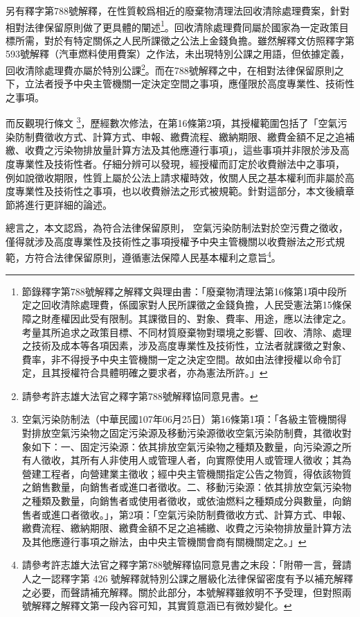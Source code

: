 \documentclass[12pt,a4paper]{article}
\begin{document}

另有釋字第788號解釋，在性質較爲相近的廢棄物清理法回收清除處理費案，針對相對法律保留原則做了更具體的闡述\footnote{節錄釋字第788號解釋之解釋文與理由書：「廢棄物清理法第16條第1項中段所定之回收清除處理費，係國家對人民所課徵之金錢負擔，人民受憲法第15條保障之財產權因此受有限制。其課徵目的、對象、費率、用途，應以法律定之。考量其所追求之政策目標、不同材質廢棄物對環境之影響、回收、清除、處理之技術及成本等各項因素，涉及高度專業性及技術性，立法者就課徵之對象、費率，非不得授予中央主管機關一定之決定空間。故如由法律授權以命令訂定，且其授權符合具體明確之要求者，亦為憲法所許。」}。回收清除處理費同屬於國家為一定政策目標所需，對於有特定關係之人民所課徵之公法上金錢負擔。雖然解釋文仿照釋字第593號解釋（汽車燃料使用費案）之作法，未出現特別公課之用語，但依據定義，回收清除處理費亦屬於特別公課\footnote{請參考許志雄大法官之釋字第788號解釋協同意見書。}。而在788號解釋之中，在相對法律保留原則之下，立法者授予中央主管機關一定決定空間之事項，應僅限於高度專業性、技術性之事項。

而反觀現行條文
\footnote{空氣污染防制法（中華民國107年06月25日）第16條第1項：「各級主管機關得對排放空氣污染物之固定污染源及移動污染源徵收空氣污染防制費，其徵收對象如下：一、固定污染源：依其排放空氣污染物之種類及數量，向污染源之所有人徵收，其所有人非使用人或管理人者，向實際使用人或管理人徵收；其為營建工程者，向營建業主徵收；經中央主管機關指定公告之物質，得依該物質之銷售數量，向銷售者或進口者徵收。二、移動污染源：依其排放空氣污染物之種類及數量，向銷售者或使用者徵收，或依油燃料之種類成分與數量，向銷售者或進口者徵收。」，第2項：「空氣污染防制費徵收方式、計算方式、申報、繳費流程、繳納期限、繳費金額不足之追補繳、收費之污染物排放量計算方法及其他應遵行事項之辦法，由中央主管機關會商有關機關定之。」}，歷經數次修法，在第16條第2項，其授權範圍包括了「空氣污染防制費徵收方式、計算方式、申報、繳費流程、繳納期限、繳費金額不足之追補繳、收費之污染物排放量計算方法及其他應遵行事項」，這些事項并非限於涉及高度專業性及技術性者。仔細分辨可以發現，經授權而訂定於收費辦法中之事項，
例如說徵收期限，性質上屬於公法上請求權時效，攸關人民之基本權利而非屬於高度專業性及技術性之事項，也以收費辦法之形式被規範。針對這部分，本文後續章節將進行更詳細的論述。


總言之，本文認爲，為符合法律保留原則，
空氣污染防制法對於空污費之徵收，僅得就涉及高度專業性及技術性之事項授權予中央主管機關以收費辦法之形式規範，方符合法律保留原則，遵循憲法保障人民基本權利之意旨\footnote{請參考許志雄大法官之釋字第788號解釋協同意見書之末段：「附帶一言，聲請人之一認釋字第 426 號解釋就特別公課之層級化法律保留密度有予以補充解釋之必要，而聲請補充解釋。關於此部分，本號解釋雖敘明不予受理，但對照兩號解釋之解釋文第一段內容可知，其實質意涵已有微妙變化。}。
\end{document}
